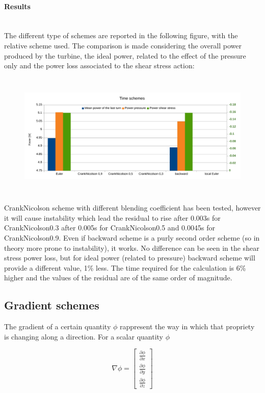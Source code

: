 \documentclass[a4paper,12pt]{article}
\begin{document}
\paragraph{Results} \mbox{}\\
The different type of schemes are reported in the following figure, with the relative scheme used. The comparison is made considering the overall power produced by the turbine, the ideal power, related to the effect of the pressure only and the power loss associated to the shear stress action:
\begin{figure}[H]
\centering
\includegraphics[height=6cm]{images/schemes/timeschems-results.pdf}
\end{figure}

CrankNicolson scheme with different blending coefficient has been tested, however it will cause instability which lead the residual to rise after 0.003s for CrankNicolson0.3 after 0.005s for CrankNicolson0.5 and 0.0045s for CrankNicolson0.9.
Even if backward scheme is a purly second order scheme (so in theory more prone to instability), it works.
No difference can be seen in the shear stress power loss, but for ideal power (related to pressure) backward scheme will provide a different value, 1\% less. The time required for the calculation is 6\% higher and the values of the residual are of the same order of magnitude.



\subsection{Gradient schemes}
The gradient of a certain quantity $\phi$ rappresent the way in which that propriety is changing along a direction. For a scalar quantity $\phi$
 
\begin{equation}
\nabla \phi = \begin{bmatrix} \frac{\partial \phi}{\partial x} \\ \frac{\partial \phi}{\partial y} \\\frac{\partial \phi}{\partial z}\end{bmatrix} 
\end{equation}
\end{document}
